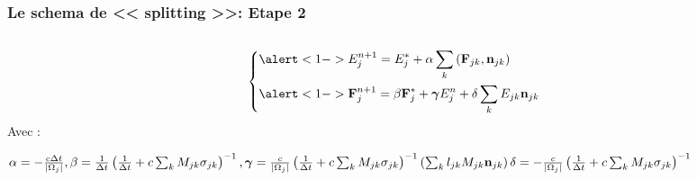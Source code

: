\begin{frame}
  \frametitle{Le schema de << splitting >>: Etape 2}   %
  \begin{columns}
    \begin{column}{0.6\textwidth}
      \begingroup
      \normalsize
      \begin{equation*} 
          \begin{dcases}
          \alert<1->{E_j^{n+1} = E_j^* + \alpha \sum_k \left( \bvec F_{jk}, \bvec n_{jk} \right)} \\
          \alert<1->{\bvec F_j^{n+1} = \beta \bvec F_j^* + \bm{\gamma} E_j^n + \delta \sum_k E_{jk} \bvec n_{jk}}
          \end{dcases}   
      \end{equation*}
      Avec :
      \scriptsize
    
        $\alpha = -\frac{c \Delta t}{\left| \Omega_j \right|}, \linebreak
        \beta = \frac{1}{\Delta t} \left( \frac{1}{\Delta t} + c \sum_k M_{jk} \sigma_{jk} \right)^{-1}, \linebreak
        \bm{\gamma} = \frac{c}{\left| \Omega_j \right|} \left( \frac{1}{\Delta t} + c \sum_k M_{jk} \sigma_{jk} \right)^{-1} \left( \sum_k l_{jk} M_{jk} \bvec n_{jk} \right) \linebreak
        \delta = -\frac{c}{\left| \Omega_j \right|} \left( \frac{1}{\Delta t} + c \sum_k M_{jk} \sigma_{jk} \right)^{-1}$

    \endgroup
      

\end{column}
\end{columns}
\end{frame}
